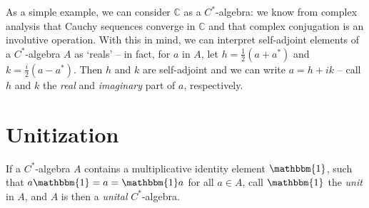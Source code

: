 \documentclass[11pt,a4paper]{report}
\theoremstyle{plain}
\theoremstyle{definition}
\newcommand{\1}{\mathbbm{1}}
\newcommand{\C}{\mathbb{C}}
\begin{document}
As a simple example, we can consider $\C$ as a $C^\ast$-algebra: we know from 
complex analysis that Cauchy sequences converge in $\C$ and that complex 
conjugation is an involutive operation. With this in mind, we can interpret 
self-adjoint elements of a $C^\ast$-algebra $A$ as `reals' -- in fact, for $a$ 
in $A$, let $h=\tfrac{1}{2}(a+a^\ast)$ and $k=\tfrac{i}{2}(a-a^\ast)$. Then $h$ 
and $k$ are self-adjoint and we can write $a=h+ik$ -- call $h$ and $k$ the 
\emph{real} and \emph{imaginary} part of $a$, respectively. 

\section{Unitization}\label{section:unit}
If a $C^\ast$-algebra $A$ contains a multiplicative identity element $\1$, such 
that $a \1 = a = \1  a$ for all $a \in A$, call $\1$ the \emph{unit} in $A$, and 
$A$ is then a \emph{unital} $C^\ast$-algebra.
\end{document}
